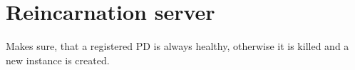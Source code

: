 
\section{Reincarnation server}
\label{sec:reincarnation_server}

Makes sure, that a registered PD is always healthy, otherwise
it is killed and a new instance is created.
